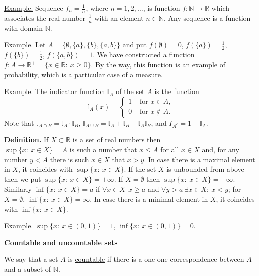 \documentclass[a4paper,10pt]{article}
\def\NN{\mathbb{N}}
\def\RR{\mathbb{R}}
\def\II{\mathbb{I}}
\newcommand{\1}[1]{\mathbf{1}_{\{#1\}}}
\begin{document}
\underline{Example.} Sequence $f_n=\frac{1}{n}$, where $n=1,2,\ldots$, is function $f:\NN\to\RR$ which associates the real number $\frac{1}{n}$ with an element $n\in\NN$. Any sequence is a function with domain $\NN$. \vspace{3mm}

\underline{Example.} Let $A=\{\emptyset, \{a\},\{b\},\{a,b\}\}$ and put $f(\emptyset)=0$, $f(\{a\})=\frac{1}{2}$, $f(\{b\})=\frac{1}{2}$, $f(\{a,b\})=1$. We have constructed a function $f:A\to\RR^+=\{x\in\RR:~x\ge 0\}$. By the way, this function is an example of \underline{probability}, which is a particular case of a \underline{measure}.\vspace{3mm}

\underline{Example.} The \underline{indicator} function $\II_A$ of the set $A$ is the function
  $$\II_A(x)=\left\{\begin{array}{ll}
1 & \mbox{ for } x\in A, \\ 0 & \mbox{ for } x\notin A. \end{array}\right. $$
Note that $\II_{A\cap B}=\II_A\cdot \II_B$, $\II_{A\cup B}=\II_A+\II_B-\II_A\II_B$, and $I_{A^c}=1-\II_A$. \vspace{3mm}

{\bf Definition.} If $X\subset \RR$ is a set of real numbers then \\
$\sup\{x:~x\in X\}=A$ is such a number that $x\le A$ for all $x\in X$ and, for any number $y<A$ there is such $x\in X$ that $x>y$. In case there is a maximal element in $X$, it coincides with $\sup\{x:~x\in X\}$. If the set $X$ is unbounded from above then we put $\sup\{x:~x\in X\}=+\infty$. If $X=\emptyset$ then $\sup\{x:~x\in X\}=-\infty$.\vspace{2mm}\\
Similarly $\inf\{x:~x\in X\}=a$ if $\forall x \in X~~x\ge a$ and $\forall y>a~\exists x\in X:~x<y$; for $X=\emptyset$, $\inf\{x:~x\in X\}=\infty$. In case there is a minimal element in $X$, it coincides with $\inf\{x:~x\in X\}$. \vspace{3mm}

\underline{Example.} $\sup\{x:~x\in(0,1)\}=1$, $\inf\{x:~x\in(0,1)\}=0$.
\vspace{5mm}

\begin{center}\bf\underline{Countable and uncountable sets} \end{center}

We say that a set $A$ is \underline{countable} if there is a one-one correspondence between $A$ and a subset of $\NN$.
\end{document}
